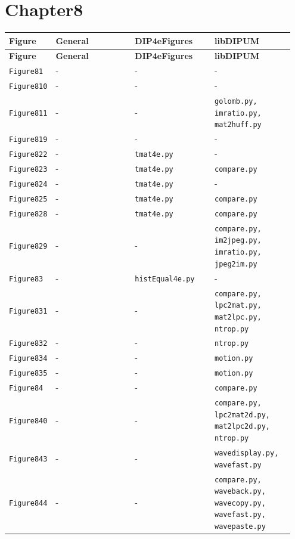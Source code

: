 \documentclass[10pt]{article}
\begin{document}
\section*{Chapter8}
\setlength{\tabcolsep}{4pt}
\begin{longtable}{p{0.11\linewidth} p{0.28\linewidth} p{0.28\linewidth} p{0.28\linewidth}}
\toprule
\textbf{Figure} & \textbf{General} & \textbf{DIP4eFigures} & \textbf{libDIPUM} \\
\midrule
\endfirsthead
\toprule
\textbf{Figure} & \textbf{General} & \textbf{DIP4eFigures} & \textbf{libDIPUM} \\
\midrule
\endhead
\bottomrule
\endfoot
\texttt{Figure81} & - & - & - \\
\texttt{Figure810} & - & - & - \\
\texttt{Figure811} & - & - & \texttt{golomb.py, imratio.py, mat2huff.py} \\
\texttt{Figure819} & - & - & - \\
\texttt{Figure822} & - & \texttt{tmat4e.py} & - \\
\texttt{Figure823} & - & \texttt{tmat4e.py} & \texttt{compare.py} \\
\texttt{Figure824} & - & \texttt{tmat4e.py} & - \\
\texttt{Figure825} & - & \texttt{tmat4e.py} & \texttt{compare.py} \\
\texttt{Figure828} & - & \texttt{tmat4e.py} & \texttt{compare.py} \\
\texttt{Figure829} & - & - & \texttt{compare.py, im2jpeg.py, imratio.py, jpeg2im.py} \\
\texttt{Figure83} & - & \texttt{histEqual4e.py} & - \\
\texttt{Figure831} & - & - & \texttt{compare.py, lpc2mat.py, mat2lpc.py, ntrop.py} \\
\texttt{Figure832} & - & - & \texttt{ntrop.py} \\
\texttt{Figure834} & - & - & \texttt{motion.py} \\
\texttt{Figure835} & - & - & \texttt{motion.py} \\
\texttt{Figure84} & - & - & \texttt{compare.py} \\
\texttt{Figure840} & - & - & \texttt{compare.py, lpc2mat2d.py, mat2lpc2d.py, ntrop.py} \\
\texttt{Figure843} & - & - & \texttt{wavedisplay.py, wavefast.py} \\
\texttt{Figure844} & - & - & \texttt{compare.py, waveback.py, wavecopy.py, wavefast.py, wavepaste.py} \\

\end{longtable}
\end{document}
